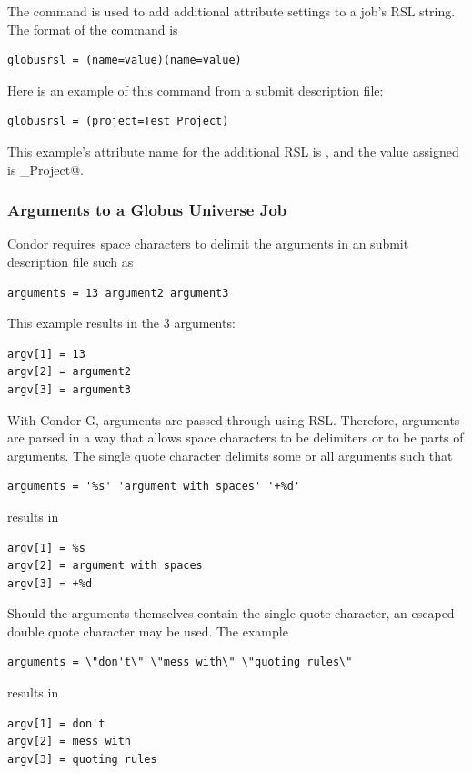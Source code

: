 The  command is used to add additional
attribute settings to a job's RSL string.
The format of the  command is
\begin{verbatim}
globusrsl = (name=value)(name=value)
\end{verbatim}
Here is an example of this command from a submit description file:
\begin{verbatim}
globusrsl = (project=Test_Project)
\end{verbatim}
This example's attribute name for the additional RSL is
\verb@project@, and the value assigned is \verb@Test_Project@.

\subsubsection{\label{sec:CondorG-Submit-Args}Arguments to a Globus Universe Job}

Condor requires space characters to delimit the arguments
in an submit description file such as
\begin{verbatim}
arguments = 13 argument2 argument3
\end{verbatim}
This example results in the 3 arguments:
\begin{verbatim}
argv[1] = 13
argv[2] = argument2
argv[3] = argument3
\end{verbatim}

With Condor-G, arguments are passed through using RSL.
Therefore, arguments are parsed in a way that allows space characters
to be delimiters or to be parts of arguments.
The single quote character delimits some or all arguments such that
\begin{verbatim}
arguments = '%s' 'argument with spaces' '+%d'
\end{verbatim}
results in
\begin{verbatim}
argv[1] = %s
argv[2] = argument with spaces
argv[3] = +%d
\end{verbatim}

Should the arguments themselves contain the single quote character,
an escaped double quote character may be used.
The example
\begin{verbatim}
arguments = \"don't\" \"mess with\" \"quoting rules\"
\end{verbatim}
results in 
\begin{verbatim}
argv[1] = don't
argv[2] = mess with
argv[3] = quoting rules
\end{verbatim}

